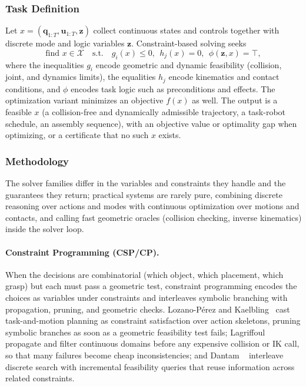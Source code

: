 \subsubsection{Task Definition}
Let $x=(\mathbf{q}_{1:T},\mathbf{u}_{1:T},\mathbf{z})$ collect continuous states and controls together with discrete mode and logic variables $\mathbf{z}$. Constraint-based solving seeks
\begin{equation}
\text{find } x\in\mathcal{X}\quad\text{s.t.}\quad g_i(x)\le 0,\ \ h_j(x)=0,\ \ \phi(\mathbf{z},x)=\top,
\end{equation}
where the inequalities $g_i$ encode geometric and dynamic feasibility (collision, joint, and dynamics limits), the equalities $h_j$ encode kinematics and contact conditions, and $\phi$ encodes task logic such as preconditions and effects. The optimization variant minimizes an objective $f(x)$ as well. The output is a feasible $x$ (a collision-free and dynamically admissible trajectory, a task-robot schedule, an assembly sequence), with an objective value or optimality gap when optimizing, or a certificate that no such $x$ exists.

\subsubsection{Methodology}
The solver families differ in the variables and constraints they handle and the guarantees they return; practical systems are rarely pure, combining discrete reasoning over actions and modes with continuous optimization over motions and contacts, and calling fast geometric oracles (collision checking, inverse kinematics) inside the solver loop.

\paragraph{Constraint Programming (CSP/CP).}
When the decisions are combinatorial (which object, which placement, which grasp) but each must pass a geometric test, constraint programming encodes the choices as variables under constraints and interleaves symbolic branching with propagation, pruning, and geometric checks. Lozano-P{\'e}rez and Kaelbling~\cite{LozanoPerez2014ConstraintTAMP} cast task-and-motion planning as constraint satisfaction over action skeletons, pruning symbolic branches as soon as a geometric feasibility test fails; Lagriffoul \etal~\cite{Lagriffoul2012ConstraintPropagation} propagate and filter continuous domains before any expensive collision or IK call, so that many failures become cheap inconsistencies; and Dantam \etal~\cite{Dantam2018IncrementalTAMP} interleave discrete search with incremental feasibility queries that reuse information across related constraints.

